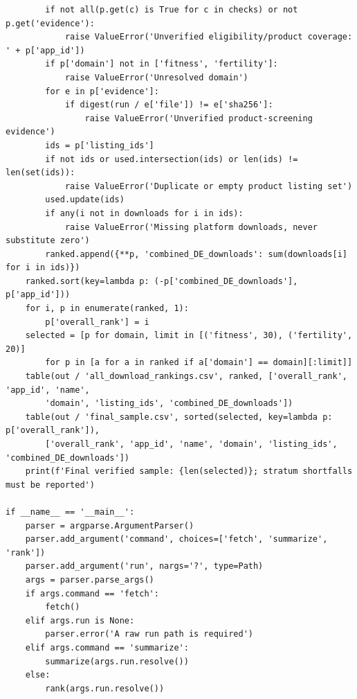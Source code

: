 \documentclass[10pt,a4paper]{article}
\begin{document}
\begin{lstlisting}
        if not all(p.get(c) is True for c in checks) or not p.get('evidence'):
            raise ValueError('Unverified eligibility/product coverage: ' + p['app_id'])
        if p['domain'] not in ['fitness', 'fertility']:
            raise ValueError('Unresolved domain')
        for e in p['evidence']:
            if digest(run / e['file']) != e['sha256']:
                raise ValueError('Unverified product-screening evidence')
        ids = p['listing_ids']
        if not ids or used.intersection(ids) or len(ids) != len(set(ids)):
            raise ValueError('Duplicate or empty product listing set')
        used.update(ids)
        if any(i not in downloads for i in ids):
            raise ValueError('Missing platform downloads, never substitute zero')
        ranked.append({**p, 'combined_DE_downloads': sum(downloads[i] for i in ids)})
    ranked.sort(key=lambda p: (-p['combined_DE_downloads'], p['app_id']))
    for i, p in enumerate(ranked, 1):
        p['overall_rank'] = i
    selected = [p for domain, limit in [('fitness', 30), ('fertility', 20)]
        for p in [a for a in ranked if a['domain'] == domain][:limit]]
    table(out / 'all_download_rankings.csv', ranked, ['overall_rank', 'app_id', 'name',
        'domain', 'listing_ids', 'combined_DE_downloads'])
    table(out / 'final_sample.csv', sorted(selected, key=lambda p: p['overall_rank']),
        ['overall_rank', 'app_id', 'name', 'domain', 'listing_ids', 'combined_DE_downloads'])
    print(f'Final verified sample: {len(selected)}; stratum shortfalls must be reported')

if __name__ == '__main__':
    parser = argparse.ArgumentParser()
    parser.add_argument('command', choices=['fetch', 'summarize', 'rank'])
    parser.add_argument('run', nargs='?', type=Path)
    args = parser.parse_args()
    if args.command == 'fetch':
        fetch()
    elif args.run is None:
        parser.error('A raw run path is required')
    elif args.command == 'summarize':
        summarize(args.run.resolve())
    else:
        rank(args.run.resolve())

\end{lstlisting}
\end{document}
